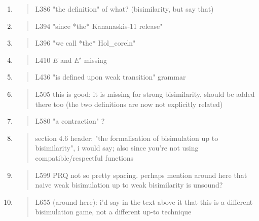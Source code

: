 \begin{enumerate}
\item \begin{quote}
    L386 "the definition" of what? (bisimilarity, but say that)
  \end{quote}

\item \begin{quote}
    L394 "since *the* Kananaskis-11 release"
  \end{quote}

\item \begin{quote}
    L396 "we call *the* Hol_coreln"
  \end{quote}

\item \begin{quote}
    L410 $E$ and $E'$ missing
  \end{quote}

\item \begin{quote}
    L436 "is defined upon weak transition" grammar
  \end{quote}

\item \begin{quote}
    L505 this is good: it is missing for strong bisimilarity, should
    be added there too (the two definitions are now not explicitly
    related)
  \end{quote}

\item \begin{quote}
    L580 "a contraction" ?
  \end{quote}

\item \begin{quote}
    section 4.6 header: "the formalisation of bisimulation up to
    bisimilarity", i would say; also since you're not using
    compatible/respectful functions
  \end{quote}

\item \begin{quote}
    L599 PRQ not so pretty spacing. perhaps mention around here that
    naive weak bisimulation up to weak bisimilarity is unsound?
  \end{quote}

\item \begin{quote}
    L655 (around here): i'd say in the text above it that this is a
    different bisimulation game, not a different up-to technique
  \end{quote}


\end{enumerate}
